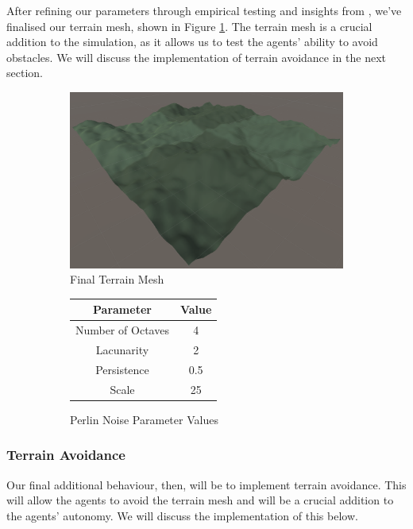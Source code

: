\documentclass[12pt]{article}
\begin{document}
After refining our parameters through empirical testing and insights from \cite[pg.3-4]{Etherington}, we've finalised our terrain mesh, shown in Figure \ref{fig:final}. The terrain mesh is a crucial addition to the simulation, as it allows us to test the agents' ability to avoid obstacles. We will discuss the implementation of terrain avoidance in the next section.

\begin{figure}
    \centering
    \begin{subfigure}{0.4\textwidth}
        \centering
        \includegraphics[width=\linewidth]{lacunarity2.png}
        \caption{Final Terrain Mesh}
        \label{fig:final}
    \end{subfigure}
    \hfill
    \begin{subfigure}{0.4\textwidth}
        \centering
        \begin{tabular}{|c|c|}
            \hline
            Parameter & Value \\
            \hline
            Number of Octaves & 4 \\
            \hline
            Lacunarity & 2 \\
            \hline
            Persistence & 0.5 \\
            \hline
            Scale & 25 \\
            \hline
        \end{tabular}
        \caption{Perlin Noise Parameter Values}
        \label{tab:parameter-values}
    \end{subfigure}
    \caption{}
    \label{fig:parameter-values-lacunarity2}
\end{figure}


\subsubsection{Terrain Avoidance}
\label{sec:terrain-avoidance}
Our final additional behaviour, then, will be to implement terrain avoidance. This will allow the agents to avoid the terrain mesh and will be a crucial addition to the agents' autonomy. We will discuss the implementation of this below.
\end{document}
